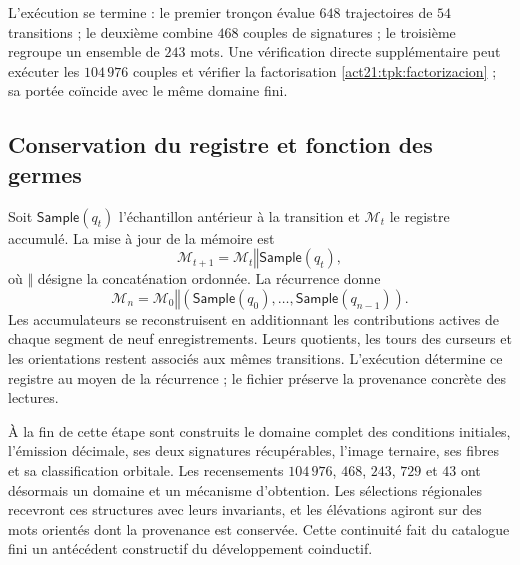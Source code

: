 L'exécution se termine : le premier tronçon évalue \(648\) trajectoires de \(54\) transitions ; le deuxième combine \(468\) couples de signatures ; le troisième regroupe un ensemble de \(243\) mots. Une vérification directe supplémentaire peut exécuter les \(104\,976\) couples et vérifier la factorisation \eqref{act21:tpk:factorizacion} ; sa portée coïncide avec le même domaine fini.

\subsection{Conservation du registre et fonction des germes}
\label{act21:tpk:conclusion}

Soit \(\mathsf{Sample}(q_t)\) l'échantillon antérieur à la transition et \(\mathcal M_t\) le registre accumulé. La mise à jour de la mémoire est
\begin{equation}
 \mathcal M_{t+1}=\mathcal M_t\mathbin{\Vert}\mathsf{Sample}(q_t),
 \label{act21:tpk:archivo}
\end{equation}
où \(\Vert\) désigne la concaténation ordonnée. La récurrence donne
\[
 \mathcal M_n=\mathcal M_0\mathbin{\Vert}
 (\mathsf{Sample}(q_0),\ldots,\mathsf{Sample}(q_{n-1})).
\]
Les accumulateurs se reconstruisent en additionnant les contributions actives de
chaque segment de neuf enregistrements. Leurs quotients, les tours des
curseurs et les orientations restent associés aux mêmes transitions.
L'exécution détermine ce registre au moyen de la récurrence ; le fichier
préserve la provenance concrète des lectures.





À la fin de cette étape sont construits le domaine complet des conditions
initiales, l'émission décimale, ses deux signatures récupérables, l'image ternaire,
ses fibres et sa classification orbitale. Les recensements \(104\,976\), \(468\),
\(243\), \(729\) et \(43\) ont désormais un domaine et un mécanisme d'obtention.
Les sélections régionales recevront ces structures avec leurs invariants,
et les élévations agiront sur des mots orientés dont la provenance est
conservée. Cette continuité fait du catalogue fini un antécédent
constructif du développement coinductif.
